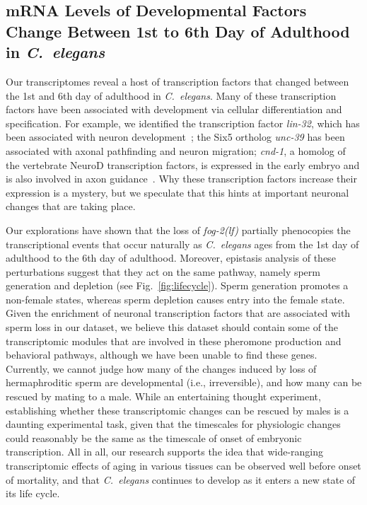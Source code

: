 \documentclass[10pt,letterpaper,twocolumn]{article}
\newcommand{\cel}{\emph{C.~elegans}}
\newcommand{\fog}{\emph{\mbox{fog-2(lf)}}}
\begin{document}
\subsection*{mRNA Levels of Developmental Factors Change Between 1st
             to 6th Day of Adulthood in \cel{}}
\label{sub:development_in_aging}

Our transcriptomes reveal a host of transcription factors that changed between
the 1st and 6th day of adulthood in \cel{}. Many of these transcription factors
have been associated with development via cellular differentiation and
specification. For example, we identified the transcription factor
\emph{lin-32}, which has been associated with neuron
development~\cite{Chalfie1989,Zhao1995,Portman2000}; the Six5 ortholog
\emph{unc-39} has been associated with axonal pathfinding and neuron
migration\cite{Manser1990,Yanowitz2004}; \emph{cnd-1}, a homolog  of the
vertebrate NeuroD transcription factors, is expressed in the early embryo and is
also involved in axon guidance~\cite{Schmitz2007}.
Why these transcription factors increase their expression is a mystery,
but we speculate that this hints at important neuronal changes that are
taking place.

Our explorations have shown that the loss of \fog{} partially phenocopies the
transcriptional events that occur naturally as \cel{} ages from the 1st day of
adulthood to the 6th day of adulthood. Moreover, epistasis analysis of these
perturbations suggest that they act on the same pathway, namely sperm generation
and depletion (see Fig.~\ref{fig:lifecycle}). Sperm generation promotes a non-female
states, whereas sperm depletion causes entry into the female state.
Given the enrichment of neuronal transcription factors that are associated with
sperm loss in our dataset, we believe this dataset should contain some of the
transcriptomic modules that are involved in these pheromone production and
behavioral pathways, although we have been unable to find these genes.
Currently, we cannot judge how many of the changes induced by loss of
hermaphroditic sperm are developmental (i.e., irreversible), and how many can be
rescued by mating to a male.
While an entertaining thought experiment, establishing whether these
transcriptomic changes can be rescued by males is a daunting experimental task,
given that the timescales for physiologic changes could reasonably be the same
as the timescale of onset of embryonic transcription. All in all, our research
supports the idea that wide-ranging transcriptomic effects of aging in various
tissues can be observed well before onset of mortality, and that \cel{}
continues to develop as it enters a new state of its life cycle.
\end{document}
